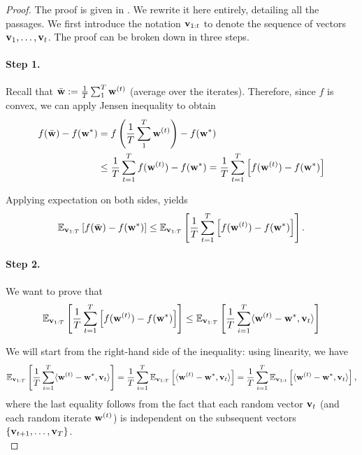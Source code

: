 \documentclass{article}
\begin{document}
\begin{proof} The proof is given in \cite{Shalev2014}. We rewrite it here entirely, detailing all the passages. 
We first introduce the notation ${\bf v}_{1:t}$ to denote the sequence of vectors ${\bf v}_1, \ldots, {\bf v}_t$. The proof can be broken down in three steps. 

\paragraph{ Step 1.} Recall that $\bar{\bf w} := \frac{1}{T} \sum_{1}^T {\bf w}^{(t)}$ (average over the iterates). Therefore, since $f$ is convex, we can apply Jensen inequality to obtain
\begin{align}
f(\bar{\bf w}) - f({\bf w}^\ast) & = f\left( \frac{1}{T} \sum_{1}^T {\bf w}^{(t)} \right) - f({\bf w}^\ast) \nonumber \\
&\leq \dfrac{1}{T} \sum_{t=1}^T f({\bf w}^{(t)}) -  f({\bf w}^\ast) =  \dfrac{1}{T} \sum_{t=1}^T\left[  f({\bf w}^{(t)}) -  f({\bf w}^\ast) \right]
\end{align}

Applying expectation on both sides, yields
\begin{gather}
\mathbb{E}_{{\bf v}_{1:T}} \left[ f(\bar{\bf w}) - f({\bf w}^\ast) \right] \leq \mathbb{E}_{{\bf v}_{1:T}} \left[ \dfrac{1}{T}  \sum_{t=1}^T\left[  f({\bf w}^{(t)}) -  f({\bf w}^\ast) \right] \right].
\end{gather}


\paragraph{ Step 2.} We want to prove that 
\begin{gather}
\mathbb{E}_{{\bf v}_{1:T}} \left[ \dfrac{1}{T}  \sum_{t=1}^T\left[  f({\bf w}^{(t)}) -  f({\bf w}^\ast) \right] \right] \leq \mathbb{E}_{{\bf v}_{1:T}} \left[\dfrac{1}{T} \sum_{i=1}^T \langle {\bf w}^{(t)} - {\bf w}^\ast, {\bf v}_t\rangle \right] \label{step2}
\end{gather}

We will start from the right-hand side of the inequality:  using linearity, we have
\begin{gather}
\mathbb{E}_{{\bf v}_{1:T}} \left[\dfrac{1}{T} \sum_{i=1}^T \langle {\bf w}^{(t)} - {\bf w}^\ast, {\bf v}_t\rangle \right] = \dfrac{1}{T}  \sum_{i=1}^T \mathbb{E}_{{\bf v}_{1:T}} \left[ \langle {\bf w}^{(t)} - {\bf w}^\ast, {\bf v}_t\rangle \right]  = \dfrac{1}{T}  \sum_{i=1}^T \mathbb{E}_{{\bf v}_{1:t}} \left[ \langle {\bf w}^{(t)} - {\bf w}^\ast, {\bf v}_t\rangle \right] , \label{6}
\end{gather}
where the last equality follows from the fact that each random vector ${\bf v}_t$ (and each random iterate ${\bf w}^{(t)}$) is independent on the subsequent vectors $\{{\bf v}_{t+1}, \ldots, {\bf v}_T\}$.\\


\end{proof}
\end{document}
